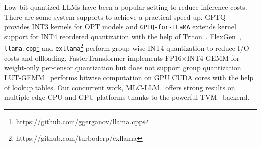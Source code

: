  Low-bit quantized LLMs have been a popular setting to reduce inference costs. There are some system supports to achieve a practical speed-up. GPTQ~\cite{frantar2022gptq} provides INT3 kernels for OPT models and \texttt{GPTQ-for-LLaMA} extends kernel support for INT4 reordered quantization with the help of Triton~\cite{tillet2019triton}. FlexGen~\cite{sheng2023high}, \texttt{llama.cpp}\footnote{https://github.com/ggerganov/llama.cpp} and \texttt{exllama}\footnote{https://github.com/turboderp/exllama} perform group-wise INT4 quantization to reduce I/O costs and offloading. FasterTransformer implements FP16$\times$INT4 GEMM for weight-only per-tensor quantization but does not support group quantization. LUT-GEMM~\cite{park2022nuqmm} performs bitwise computation on GPU CUDA cores with the help of lookup tables. Our concurrent work, MLC-LLM~\cite{mlc-llm} offers strong results on multiple edge CPU and GPU platforms thanks to the powerful TVM~\cite{chen2018tvm,feng2022tensorir} backend. %


